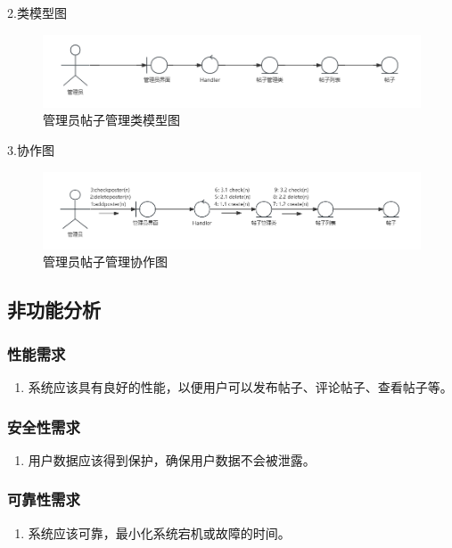 \documentclass[UTF8]{ctexart}
\begin{document}
2.类模型图

\begin{figure}[H]
  \centering
  \includegraphics[scale=0.3]{类图/管理员帖子管理.png}
  \caption{管理员帖子管理类模型图}
\end{figure}

3.协作图

\begin{figure}[H]
  \centering
  \includegraphics[scale=0.3]{协作图/管理员帖子.png}
  \caption{管理员帖子管理协作图}
\end{figure}



\newpage
\subsection{非功能分析}

\subsubsection{性能需求}
\begin{enumerate}
  \item 系统应该具有良好的性能，以便用户可以发布帖子、评论帖子、查看帖子等。
\end{enumerate}

\subsubsection{安全性需求}
\begin{enumerate}
  \item 用户数据应该得到保护，确保用户数据不会被泄露。
\end{enumerate}

\subsubsection{可靠性需求}
\begin{enumerate}
  \item 系统应该可靠，最小化系统宕机或故障的时间。
\end{enumerate}
\end{document}
